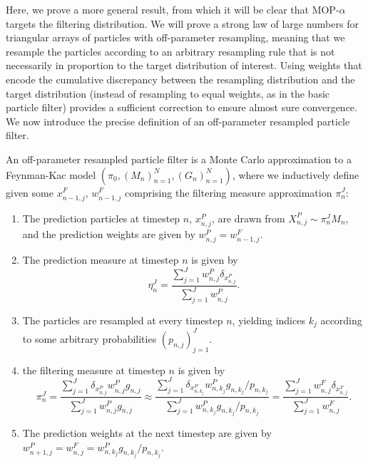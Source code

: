 

Here, we prove a more general result, from which it will be clear that MOP-$\alpha$ targets the filtering distribution. 
We will prove a strong law of large numbers for triangular arrays of particles with off-parameter resampling, meaning that we resample the particles according to an arbitrary resampling rule that is not necessarily in proportion to the target distribution of interest. 
Using weights that encode the cumulative discrepancy between the resampling distribution and the target distribution (instead of resampling to equal weights, as in the basic particle filter) provides a sufficient correction to ensure almost sure convergence.
We now introduce the precise definition of an off-parameter resampled particle filter. 

\begin{defn}
    \label{defn:off-parameter-filter}
    An off-parameter resampled particle filter is a Monte Carlo approximation to a Feynman-Kac model $\left(\pi_0,\left(M_n\right)_{n=1}^N,\left(G_n\right)_{n=1}^N\right)$, where we inductively define given some $x_{n-1,j}^F$, $w_{n-1,j}^F$ comprising the filtering measure approximation $\pi_n^J$:
    \begin{enumerate}
        \item The prediction particles at timestep $n$, $x_{n,j}^P$, are drawn from $X_{n,j}^P \sim \pi_n^J M_n$, and the prediction weights are given by $w_{n,j}^P = w_{n-1,j}^F$. 
        \item The prediction measure at timestep $n$ is given by 
        \begin{equation}
        \eta_n^J = \frac{\sum_{j=1}^J w_{n,j}^P \delta_{x_{n,j}^P}}{\sum_{j=1}^J w_{n,j}^P}.
        \end{equation}
        \item The particles are resampled at every timestep $n$, yielding indices $k_j$ according to some arbitrary probabilities $(p_{n,j})_{j=1}^J$.
        \item the filtering measure at timestep $n$ is given by
        \begin{equation}
        \pi_n^J = \frac{\sum_{j=1}^J \delta_{x_{n,j}^P }w_{n,j}^P g_{n,j}}{\sum_{j=1}^J w_{n,j}^Pg_{n,j}} \approx \frac{\sum_{j=1}^J \delta_{x_{n,k_j}^P }w_{n,k_j}^P g_{n,k_j}/p_{n,k_j}}{\sum_{j=1}^J w_{n,k_j}^Pg_{n,k_j}/p_{n,k_j}} = \frac{\sum_{j=1}^J w_{n,j}^F \delta_{x_{n,j}^F}}{\sum_{j=1}^J w_{n,j}^F}.
        \end{equation}
        \item The prediction weights at the next timestep are given by $w_{n+1,j}^P = w_{n,j}^F =  w_{n,k_j}^P g_{n,k_j}/p_{n,k_j}$.
    \end{enumerate}
\end{defn}

